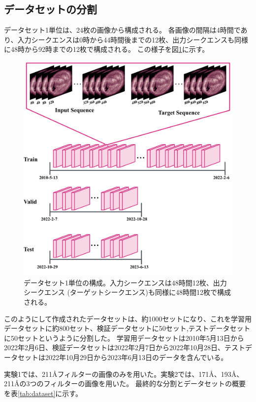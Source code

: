 \subsection{データセットの分割}
データセット1単位は、24枚の画像から構成される。
各画像の間隔は4時間であり、入力シークエンスは0時から44時間後までの12枚、出力シークエンスも同様に48時から92時までの12枚で構成される。
この様子を図\ref{fig:dataset}に示す。
\begin{figure}[htbp]
    \centering
    \includegraphics[width=\linewidth]{figures/data/dataset.jpg}
    \caption{データセット1単位の構成。入力シークエンスは48時間12枚、出力シークエンス (ターゲットシークエンス)も同様に48時間12枚で構成される。}
    \label{fig:dataset}
\end{figure}
このようにして作成されたデータセットは、約1000セットになり、これを学習用データセットに約800セット、検証データセットに50セット,テストデータセットに50セットというように分割した。
学習用データセットは2010年5月13日から2022年2月6日、検証データセットは2022年2月7日から2022年10月28日、テストデータセットは2022年10月29日から2023年6月13日のデータを含んでいる。

実験1では、211Åフィルターの画像のみを用いた。実験2では、171Å、193Å、211Åの3つのフィルターの画像を用いた。
最終的な分割とデータセットの概要を表\ref{tab:dataset}に示す。

